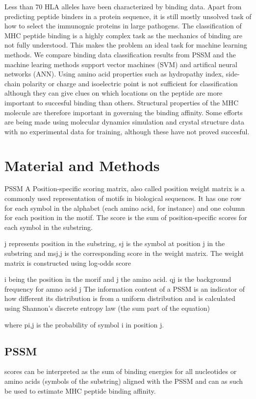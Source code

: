 \documentclass{bioinfo}
\begin{document}
\begin{application}
Less than 70 HLA alleles have been characterized by binding data. Apart from predicting peptide binders in a protein sequence, it is still  mostly unsolved task of how to select the immunognic proteins in large pathogens.
The classification of MHC peptide binding is a highly complex task as the mechanics of binding are not fully understood. 
This makes the problem an ideal task for machine learning methods. We compare binding data classification results from PSSM and the machine learing methods support vector machines (SVM) and artifical neural networks (ANN).
Using amino acid properties such as hydropathy index, side-chain polarity or charge and isoelectric point is not sufficient for classification although they can give clues on which locations on the peptide are more important to succesful binding than others. 
Structural properties of the MHC molecule are therefore important in governing the binding affinity.
Some efforts are being made using molecular dynamics simulation and crystal structure data with no experimental data for training, although these have not proved succesful.

\section*{Material and Methods}
   
PSSM
A Position-specific scoring matrix, also called position weight matrix is a commonly used representation of motifs in biological sequences. It has one row for each symbol in the alphabet (each amino acid, for instance) and one column for each position in the motif. The score is the sum of position-specific scores for each symbol in the substring.



j represents position in the substring, sj is the symbol at position j in the substring and msj,j is the corresponding score in the weight matrix. The weight matrix is constructed using log-odds score



i being the position in the morif and j the amino acid. qj is the background frequency for amno acid j
The information content of a PSSM is an indicator of how different its distribution is from a uniform distribution and is calculated using Shannon's discrete entropy law (the sum part of the equation)



where pi,j is the probability of symbol i in position j.
\subsection*{PSSM} scores can be interpreted as the sum of binding energies for all nucleotides or amino acids (symbols of the substring) aligned with the PSSM and can as such be used to estimate MHC peptide binding affinity.


\end{application}
\end{document}
